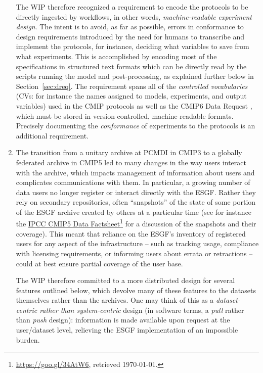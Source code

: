 \documentclass[gmd,manuscript]{copernicus}
\newcommand{\pllabel}[1]{\label{p-#1}\linelabel{l-#1}}
\newcommand{\urlref}[2] {\href{#1}{#2}\footnote{\url{#1}, retrieved \today.}}
\begin{document}
\begin{enumerate}
  The WIP therefore recognized a requirement to encode the protocols
  to be directly ingested by workflows, in other words,
  \emph{machine-readable experiment design}.
  \pllabel{RC1-14}
  The intent is to avoid, as far as possible, errors in conformance to
  design requirements introduced by the need for humans to transcribe
  and implement the protocols, for instance, deciding what variables
  to save from what experiments. This is accomplished by encoding most
  of the specifications in structured text formats which can be
  directly read by the scripts running the model and post-processing,
  as explained further below in Section~\ref{sec:dreq}. The
  requirement spans all of the \emph{controlled vocabularies} (CVs:
  for instance the names assigned to models, experiments, and output
  variables) used in the CMIP protocols as well as the CMIP6 Data
  Request \citep{ref:juckesetal2015}, which must be stored in
  version-controlled, machine-readable formats. Precisely documenting
  the \emph{conformance} of experiments to the protocols
  \citep{ref:lawrenceetal2012} is an additional requirement.
\item\label{snap} The transition from a unitary archive at PCMDI in
  CMIP3 to a globally federated archive in CMIP5 led to many changes
  in the way users interact with the archive, which impacts management
  of information about users and complicates communications with them.
  In particular, a growing number of data users no longer register or
  interact directly with the ESGF. Rather they rely on secondary
  repositories, often ``snapshots'' of the state of some portion of
  the ESGF archive created by others at a particular time (see for
  instance the \urlref{https://goo.gl/34AtW6}{IPCC CMIP5 Data
    Factsheet}
  \pllabel{RC1-15}
  for a discussion of the snapshots and their coverage). This meant
  that reliance on the ESGF's inventory of registered users for any
  aspect of the infrastructure -- such as tracking usage, compliance
  with licensing requirements, or informing users about errata or
  retractions -- could at best ensure partial coverage of the user
  base.

  The WIP therefore committed to a more distributed design for several
  features outlined below, which devolve many of these features to the
  datasets themselves rather than the archives. One may think of this
  as a \emph{dataset-centric rather than system-centric} design (in
  software terms, a \emph{pull} rather than \emph{push} design):
  information is made available upon request at the user/dataset
  level, relieving the ESGF implementation of an impossible burden.
\end{enumerate}
\end{document}
